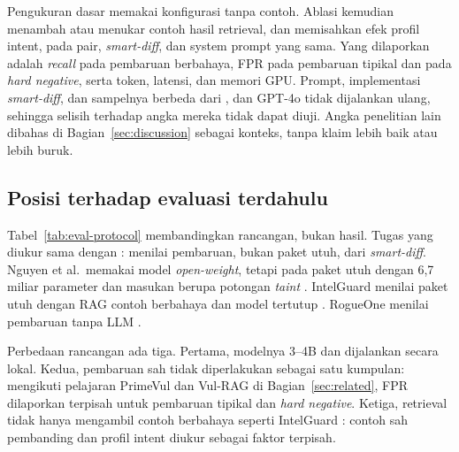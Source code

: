 \documentclass[a4paper,fleqn]{cas-dc}
\begin{document}
Pengukuran dasar memakai konfigurasi tanpa contoh. Ablasi kemudian menambah
atau menukar contoh hasil retrieval, dan memisahkan efek profil intent, pada
pair, \emph{smart-diff}, dan system prompt yang sama. Yang dilaporkan adalah
\emph{recall} pada pembaruan berbahaya, FPR pada pembaruan tipikal dan pada
\emph{hard negative}, serta token, latensi, dan memori GPU. Prompt,
implementasi \emph{smart-diff}, dan sampelnya berbeda dari
\citet{wyss2025evaluating}, dan GPT-4o tidak dijalankan ulang, sehingga selisih
terhadap angka mereka tidak dapat diuji. Angka penelitian lain dibahas di
Bagian~\ref{sec:discussion} sebagai konteks, tanpa klaim lebih baik atau lebih
buruk.

\subsection{Posisi terhadap evaluasi terdahulu}

Tabel~\ref{tab:eval-protocol} membandingkan rancangan, bukan hasil. Tugas yang
diukur sama dengan \citet{wyss2025evaluating}: menilai pembaruan, bukan paket
utuh, dari \emph{smart-diff}. Nguyen et al.\ memakai model \emph{open-weight},
tetapi pada paket utuh dengan 6,7 miliar parameter dan masukan berupa potongan
\emph{taint} \citep{nguyen2025taint}. IntelGuard menilai paket utuh dengan RAG
contoh berbahaya dan model tertutup \citep{guo2026bridging}. RogueOne menilai
pembaruan tanpa LLM \citep{sofaer2024rogueone}.

Perbedaan rancangan ada tiga. Pertama, modelnya 3--4B dan dijalankan secara
lokal. Kedua, pembaruan sah tidak diperlakukan sebagai satu kumpulan:
mengikuti pelajaran PrimeVul dan Vul-RAG di Bagian~\ref{sec:related}, FPR
dilaporkan terpisah untuk pembaruan tipikal dan \emph{hard negative}.
Ketiga, retrieval tidak hanya mengambil contoh berbahaya seperti IntelGuard
\citep{guo2026bridging}: contoh sah pembanding dan profil intent diukur
sebagai faktor terpisah.
\end{document}
